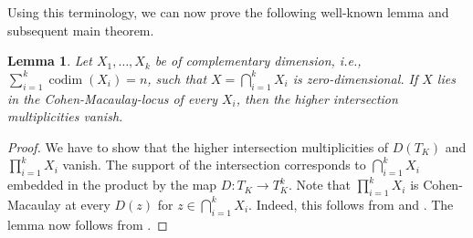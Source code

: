\documentclass[12pt,reqno,a4paper]{amsart}
\theoremstyle{theoremstyle}
\newtheorem{lemma}[theorem]{Lemma}
\theoremstyle{examplestyle}
\theoremstyle{algorithmstyle}
\DeclareMathOperator{\codim}{codim}
\begin{document}
Using this terminology, we can now prove the following well-known lemma and subsequent main theorem.

\begin{lemma}\label{lem:IntersectionMultiplicities}
  Let $X_1,\dots,X_k$ be of complementary dimension, i.e., $\sum_{i=1}^k\codim(X_{i})=n$, such that $X=\bigcap_{i=1}^k{X_{i}}$ is zero-dimensional. If $X$ lies in the Cohen-Macaulay-locus of every $X_{i}$, then the higher intersection multiplicities vanish.
\end{lemma}
\begin{proof}
  We have to show that the higher intersection multiplicities of $D(T_K)$ and $\prod_{i=1}^k X_{i}$ vanish. The support of the intersection corresponds to $\bigcap_{i=1}^k {X_{i}}$ embedded in the product by the map $D\colon T_K\to{T_K^{k}}$. Note that %
  $\prod_{i=1}^k X_{i}$ is Cohen-Macaulay at every $D(z)$ %
  for $z\in{\bigcap_{i=1}^k{X_{i}}}$. Indeed, this follows from \cite[\href{https://stacks.math.columbia.edu/tag/0C0W}{Lemma 0C0W}]{stacks-project} and  \cite[\href{https://stacks.math.columbia.edu/tag/045T}{Lemma 045T(1)}]{stacks-project}. The lemma now follows from \cite[\href{https://stacks.math.columbia.edu/tag/0B02}{Lemma 0B02}]{stacks-project}.
\end{proof}
\end{document}
